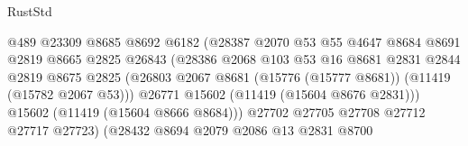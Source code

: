\begin{lexlean}{RustStd}
\begin{coremodule}
                                          @489
                                          @23309
                                          @8685
                                          @8692
                                          @6182
                                          (@28387
                                            @2070
                                            @53
                                            @55
                                            @4647
                                            @8684
                                            @8691
                                            @2819
                                            @8665
                                            @2825
                                            @26843
                                            (@28386
                                              @2068
                                              @103
                                              @53
                                              @16
                                              @8681
                                              @2831
                                              @2844
                                              @2819
                                              @8675
                                              @2825
                                              (@26803
                                                @2067
                                                @8681
                                                (@15776 (@15777 @8681))
                                                (@11419 (@15782 @2067 @53)))
                                              @26771
                                              @15602
                                              (@11419 (@15604 @8676 @2831)))
                                            @15602
                                            (@11419 (@15604 @8666 @8684)))
                                          @27702
                                          @27705
                                          @27708
                                          @27712
                                          @27717
                                          @27723)
                                        (@28432
                                          @8694
                                          @2079
                                          @2086
                                          @13
                                          @2831
                                          @8700

\end{coremodule}
\end{lexlean}
